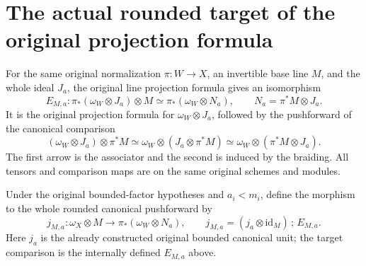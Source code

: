 \section{The actual rounded target of the original projection formula}

\begin{definition}
\label{def:kn-nadel-rounded-canonical-projection-comparison}
\leanok
For the same original normalization $\pi:W\to X$, an invertible base line
$M$, and the whole ideal $J_a$, the original line projection formula gives
an isomorphism
\[
 E_{M,a}:\pi_*(\omega_W\otimes J_a)\otimes M
   \simeq \pi_*(\omega_W\otimes N_a),
 \qquad N_a=\pi^*M\otimes J_a.
\]
It is the original projection formula for $\omega_W\otimes J_a$, followed
by the pushforward of the canonical comparison
\[
 (\omega_W\otimes J_a)\otimes\pi^*M
 \simeq\omega_W\otimes(J_a\otimes\pi^*M)
 \simeq\omega_W\otimes(\pi^*M\otimes J_a).
\]
The first arrow is the associator and the second is induced by the
braiding. All tensors and comparison maps are on the same original
schemes and modules.
\end{definition}

\begin{definition}
\label{def:kn-nadel-twisted-bounded-canonical-unit}
\leanok
Under the original bounded-factor hypotheses and $a_i<m_i$, define the
morphism to the whole rounded canonical pushforward by
\[
 j_{M,a}:\omega_X\otimes M\longrightarrow\pi_*(\omega_W\otimes N_a),
 \qquad j_{M,a}=(j_a\otimes\mathrm{id}_M)\,;\,E_{M,a}.
\]
Here $j_a$ is the already constructed original bounded canonical unit;
the target comparison is the internally defined $E_{M,a}$ above.
\end{definition}
